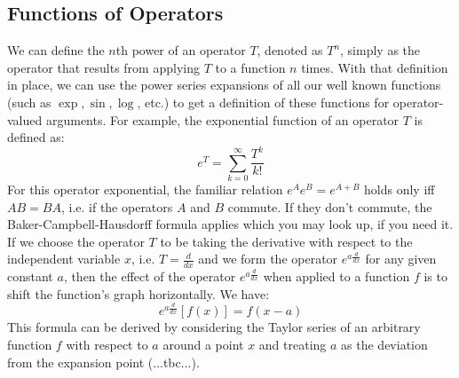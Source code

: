 \subsection{Functions of Operators}
We can define the $n$th power of an operator $T$, denoted as $T^n$, simply as the operator that results from applying $T$ to a function $n$ times. With that definition in place, we can use the power series expansions of all our well known functions (such as $\exp, \sin, \log$, etc.) to get a definition of these functions for operator-valued arguments. For example, the exponential function of an operator $T$ is defined as:
\begin{equation}
  e^T = \sum_{k=0}^{\infty} \frac{T^k}{k!}
\end{equation}
For this operator exponential, the familiar relation $e^A e^B = e^{A + B}$ holds only iff $A B = B A$, i.e. if the operators $A$ and $B$ commute. If they don't commute, the Baker-Campbell-Hausdorff formula applies which you may look up, if you need it. If we choose the operator $T$ to be taking the derivative with respect to the independent variable $x$, i.e. $T = \frac{d}{dx}$ and we form the operator $e^{a \frac{d}{dx}}$ for any given constant $a$, then the effect of the operator $e^{a \frac{d}{dx}}$ when applied to a function $f$ is to shift the function's graph horizontally. We have: 
\begin{equation}
  e^{a \frac{d}{dx}} [f(x)] = f(x-a)
\end{equation}
This formula can be derived by considering the Taylor series of an arbitrary function $f$ with respect to $a$ around a point $x$ and treating $a$ as the deviation from the expansion point (...tbc...).




